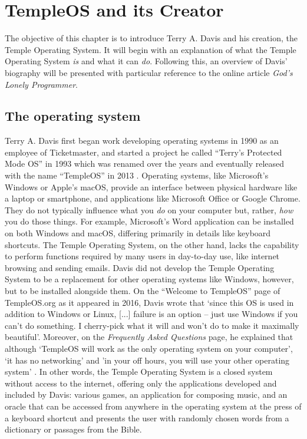 \documentclass[Draft.tex]{subfiles}
\begin{document}
\chapter{TempleOS and its Creator}

The objective of this chapter is to introduce Terry A. Davis
and his creation, the Temple Operating System.
It will begin with an explanation of what the Temple Operating System
\textit{is} and what it can \textit{do}.
Following this, an overview of Davis' biography will be presented
with particular reference to the online article \textit{God's Lonely Programmer}.

\section*{The operating system}

Terry A. Davis first began work developing operating systems in 1990
as an employee of Ticketmaster, and started a project he called
``Terry's Protected Mode OS'' in 1993 which was renamed over the years
and eventually released with the name ``TempleOS'' in 2013
\parencite{History}.
Operating systems, like Microsoft's Windows or Apple's macOS,
provide an interface between physical hardware like a laptop or smartphone,
and applications like Microsoft Office or Google Chrome.
They do not typically influence what you \textit{do}
on your computer but, rather, \textit{how} you do those things.
For example, Microsoft's Word application can be installed on both
Windows and macOS, differing primarily in details like keyboard shortcuts.
The Temple Operating System, on the other hand,
lacks the capability to perform functions required by many users
in day-to-day use, like internet browsing and sending emails.
Davis did not develop the Temple Operating System to be a
replacement for other operating systems like Windows, however,
but to be installed alongside them.
On the ``Welcome to TempleOS'' page of TempleOS.org
as it appeared in 2016\footnotemark, Davis \parencite*{Welcome} wrote that
`since this OS is used in addition to Windows or Linux,
[...] failure is an option -- just use Windows if you can't do something.
I cherry-pick what it will and won't do to make it maximally beautiful'.
Moreover, on the \textit{Frequently Asked Questions} page, he explained that
although `TempleOS will work as the only operating system on your computer',
`it has no networking' and 'in your off hours,
you will use your other operating system' \parencite{FAQ}.
In other words, the Temple Operating System is a closed system
without access to the internet, offering only the applications
developed and included by Davis: various games,
an application for composing music, and an oracle that can be accessed
from anywhere in the operating system at the press of a keyboard shortcut
and presents the user with randomly
chosen words from a dictionary or passages from the Bible.
\end{document}
